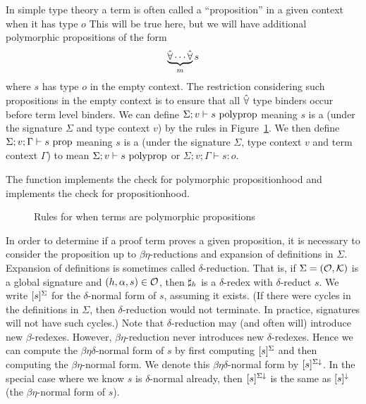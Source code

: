 In simple type theory a term is often called a ``proposition'' in a given context
when it has type $o$
This will be true here, but
we will have additional polymorphic propositions of the form
$$\underbrace{\hat{\forall}\cdots\hat{\forall}}_ms$$
where $s$ has type $o$ in the empty context.
The restriction considering such propositions in the empty context is to ensure
that all $\hat{\forall}$ type binders occur before term level binders.
We can define $\Sigma;v\vdash s ~\mbox{polyprop}$ meaning $s$ is a {}
(under the signature $\Sigma$ and type context $v$)
by the rules in Figure~\ref{fig:pprop}.
We then define $\Sigma;v;\Gamma \vdash s ~\mbox{prop}$ meaning $s$ is a {}
(under the signature $\Sigma$, type context $v$ and term context $\Gamma$)
to mean $\Sigma;v\vdash s ~\mbox{polyprop}$
or $\Sigma;v;\Gamma \vdash s:o$.

The function {} implements the check for polymorphic propositionhood
and {} implements the check for propositionhood.

\begin{figure}
\begin{center}
\end{center}
\caption{Rules for when terms are polymorphic propositions}\label{fig:pprop}
\end{figure}

In order to determine if a proof term proves a given
proposition, it is necessary to consider the proposition
up to $\beta\eta$-reductions and expansion of definitions in $\Sigma$.
Expansion of definitions is sometimes called $\delta$-reduction.
That is, if $\Sigma=(\mathcal{O},\mathcal{K})$ is a global signature
and $(h,\alpha,s)\in\mathcal{O}$, then $\mathbf{\sharp}_{h}$ is a $\delta$-redex
with $\delta$-reduct $s$.
We write $[s]^{\Sigma}$ for the $\delta$-normal form of $s$, assuming it exists.
(If there were cycles in the definitions in $\Sigma$, then $\delta$-reduction would not terminate.
In practice, signatures will not have such cycles.)
Note that $\delta$-reduction may (and often will) introduce new $\beta$-redexes.
However, $\beta\eta$-reduction never introduces new $\delta$-redexes.
Hence we can compute the $\beta\eta\delta$-normal form of $s$ by
first computing $[s]^{\Sigma}$
and then computing the $\beta\eta$-normal form.
We denote this $\beta\eta\delta$-normal form by $[s]^{\Sigma\downarrow}$.
In the special case where we know $s$ is $\delta$-normal already,
then $[s]^{\Sigma\downarrow}$ is the same as $[s]^{\downarrow}$ (the $\beta\eta$-normal form of $s$).

